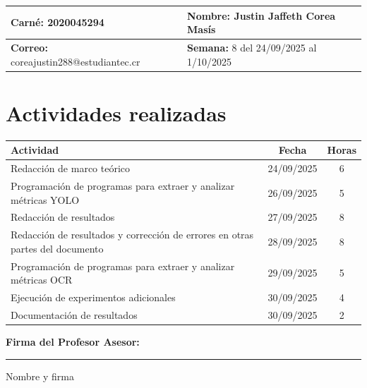 \documentclass[12pt,a4paper]{article}
\begin{document}
\noindent
\begin{tabularx}{\textwidth}{|X|X|}
\hline
\textbf{Carné:} 2020045294 & \textbf{Nombre:} Justin Jaffeth Corea Masís \\
\hline
\textbf{Correo:} coreajustin288@estudiantec.cr & \textbf{Semana:} 8 del 24/09/2025 al 1/10/2025 \\
\hline
\end{tabularx}

\vspace{0.5cm}

\section*{Actividades realizadas}

\begin{tabularx}{\textwidth}{|>{\raggedright\arraybackslash}p{12cm}|c|c|}
\hline
\textbf{Actividad} & \textbf{Fecha} & \textbf{Horas} \\
\hline
Redacción de marco teórico & 24/09/2025 & 6 \\
\hline
Programación de programas para extraer y analizar métricas YOLO & 26/09/2025 & 5 \\
\hline
Redacción de resultados & 27/09/2025 & 8 \\
\hline
Redacción de resultados y corrección de errores en otras partes del documento & 28/09/2025 & 8 \\
\hline
Programación de programas para extraer y analizar métricas OCR & 29/09/2025 & 5 \\
\hline
Ejecución de experimentos adicionales & 30/09/2025 & 4 \\
\hline
Documentación de resultados & 30/09/2025 & 2 \\
\hline
\end{tabularx}

\vspace{1cm}

\noindent
\textbf{Firma del Profesor Asesor:}

\vspace{2cm}

\noindent\rule{8cm}{0.4pt}  
Nombre y firma
\end{document}
